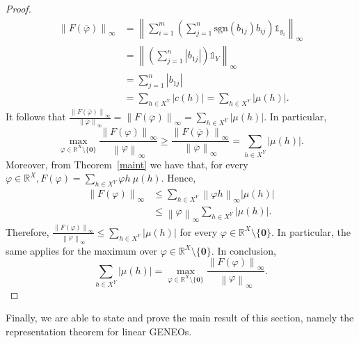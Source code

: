 \documentclass[11pt]{article}
\newcommand{\R}{\mathbb{R}}
\newcommand{\p}{\varphi}
\newtheorem{theorem}{Theorem}[section]
\begin{document}
\begin{proof}
    \begin{align*}
    \left\| F (\overline{\varphi}) \right\|_\infty & = \left\| \sum^m_{i=1}\left(\sum^n_{j=1}\mathrm{sgn}(b_{1j})b_{ij}\right)\mathds{1}_{y_i} \right\|_\infty \\
    & = \left\|\left(\sum^n_{j=1}\left| b_{1j} \right| \right)\mathds{1}_{Y}\right\|_\infty\\
    & = \sum^n_{j=1}\left| b_{1j} \right| \\
    & = \sum_{h \in X^Y} \left| c(h) \right| = \sum_{h \in X^Y} \left| \mu(h) \right|.
    \end{align*}
It follows that 
$\frac{ \left\| F (\overline{\varphi}) \right\|_\infty}{\left\| \overline{\varphi} \right\|_\infty}= \left\| F (\overline{\varphi}) \right\|_\infty = \sum_{h \in X^Y} \left| \mu(h) \right|$. In particular,
    \[
    \max_{\varphi\in\R^X\setminus\{\mathbf{0}\}}\frac{\left\| F(\varphi)\right\|_\infty}{\left\|\varphi\right\|_\infty} \ge \frac{ \left\| F (\overline{\varphi}) \right\|_\infty}{\left\| \overline{\varphi} \right\|_\infty}= \sum_{h \in X^Y} \left| \mu(h) \right|.
    \]
    Moreover, from Theorem~\ref{maint} we have that, for every $\varphi\in\R^X, F(\varphi)=\sum_{h\in X^Y}\varphi h\ {\mu}(h)$. Hence,
    \begin{align*}
        \left\| F(\varphi) \right\|_\infty & \le \sum_{h\in X^Y}\left\|\varphi h\right\|_\infty \left|{\mu}(h)\right| \\
        & \le \left\|\varphi\right\|_\infty\sum_{h\in X^Y} \left|{\mu}(h)\right|.
    \end{align*}
    Therefore, $\frac{\left\| F(\varphi)\right\|_\infty}{\left\|\varphi\right\|_\infty}\le\sum_{h\in X^Y}{\left|\mu(h)\right|}$ for every $\varphi\in\R^X\setminus\{\mathbf{0}\}$. In particular, the same applies for the maximum over $\p \in \R^X \setminus\{\mathbf{0}\}$. In conclusion, 
    \[
    \sum_{h\in X^Y}{|\mu(h)|}=\max_{\varphi\in\R^X\setminus\{\mathbf{0}\}}\frac{\left\| F(\varphi)\right\|_\infty}{\left\|\varphi\right\|_\infty}.
    \]
\end{proof}

Finally, we are able to state and prove the main result of this section, namely the representation theorem for linear GENEOs.

\end{document}
